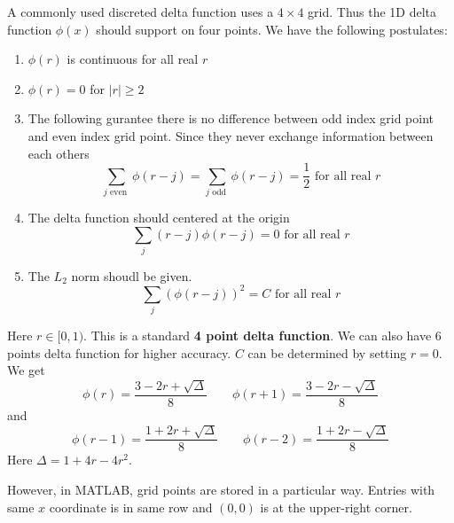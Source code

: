 \documentclass[../Immersed_Boundary_Method.tex]{subfiles}
\begin{document}
A commonly used discreted delta function uses a $4 \times 4$ grid. Thus the 1D delta function $\phi(x)$ should support on four points. We have the following postulates:
\begin{enumerate}
    \item $\phi(r)$ is continuous for all real $r$
    \item $\phi(r)=0$ for $|r| \geq 2$
    \item The following gurantee there is no difference between odd index grid point and even index grid point. Since they never exchange information between each others
    \[
    \sum_{j \text { even }} \phi(r-j)=\sum_{j \text { odd }} \phi(r-j)=\frac{1}{2} \text { for all real } r
    \]
    \item The delta function should centered at the origin
    \[
\sum_j(r-j) \phi(r-j)=0 \text { for all real } r
    \]
    \item The $L_2$ norm shoudl be given. 
    \[
    \sum_j(\phi(r-j))^2=C \text { for all real } r
    \]
\end{enumerate}
Here $r \in [0,1)$. This is a standard \textbf{4 point delta function}. We can also have 6 points delta function for higher accuracy. $C$ can be determined by setting $r = 0$. We get 
\[ \phi(r) = \frac{3 - 2r + \sqrt{\Delta}}{8} \qquad \phi(r +1) = \frac{3 - 2r - \sqrt{\Delta}}{8}\]
and 
\[ \phi(r - 1) = \frac{1 + 2r + \sqrt{\Delta}}{8} \qquad \phi(r - 2) = \frac{1 +2r - \sqrt{\Delta}}{8}\]
Here $\Delta = 1 + 4r - 4r^2$. \par
\begin{figure}
    \centering
{}
\end{figure}
However, in MATLAB, grid points are stored in a particular way. Entries with same $x$ coordinate is in same row and $(0,0)$ is at the upper-right corner. \par
\end{document}
